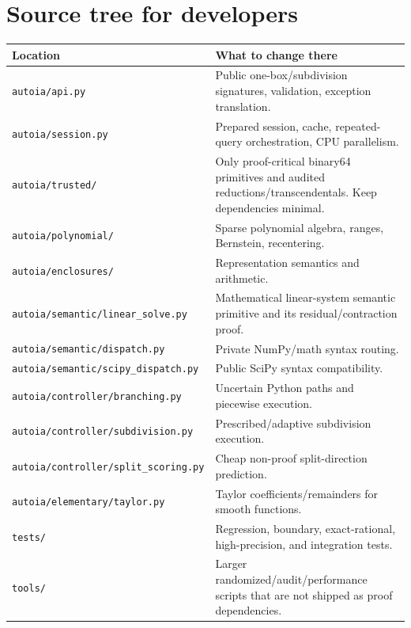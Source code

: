 \documentclass[11pt]{article}
\newcommand{\codepath}[1]{\nolinkurl{#1}}
\begin{document}
\section{Source tree for developers}

\begin{longtable}{p{}p{}}
\toprule
Location & What to change there \\
\midrule
\endhead
\codepath{autoia/api.py} & Public one-box/subdivision signatures, validation, exception translation. \\
\codepath{autoia/session.py} & Prepared session, cache, repeated-query orchestration, CPU parallelism. \\
\codepath{autoia/trusted/} & Only proof-critical binary64 primitives and audited reductions/transcendentals.  Keep dependencies minimal. \\
\codepath{autoia/polynomial/} & Sparse polynomial algebra, ranges, Bernstein, recentering. \\
\codepath{autoia/enclosures/} & Representation semantics and arithmetic. \\
\codepath{autoia/semantic/linear_solve.py} & Mathematical linear-system semantic primitive and its residual/contraction proof. \\
\codepath{autoia/semantic/dispatch.py} & Private NumPy/math syntax routing. \\
\codepath{autoia/semantic/scipy_dispatch.py} & Public SciPy syntax compatibility. \\
\codepath{autoia/controller/branching.py} & Uncertain Python paths and piecewise execution. \\
\codepath{autoia/controller/subdivision.py} & Prescribed/adaptive subdivision execution. \\
\codepath{autoia/controller/split_scoring.py} & Cheap non-proof split-direction prediction. \\
\codepath{autoia/elementary/taylor.py} & Taylor coefficients/remainders for smooth functions. \\
\codepath{tests/} & Regression, boundary, exact-rational, high-precision, and integration tests. \\
\codepath{tools/} & Larger randomized/audit/performance scripts that are not shipped as proof dependencies. \\
\bottomrule
\end{longtable}
\end{document}
